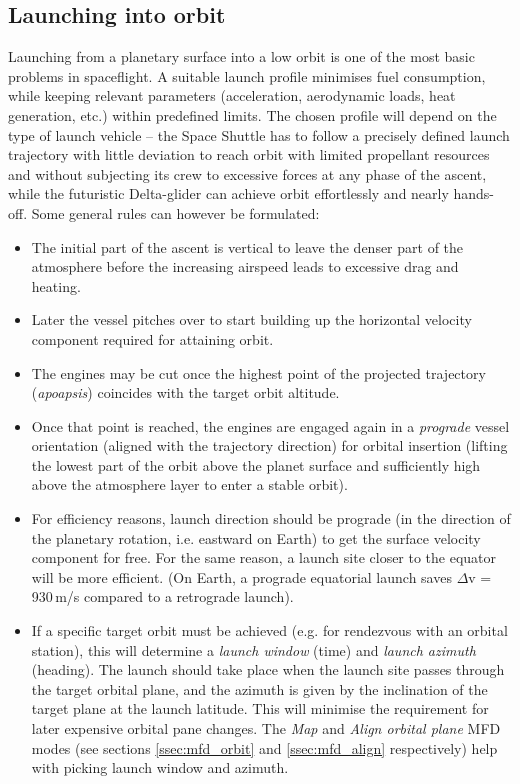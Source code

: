 \documentclass[Orbiter User Manual.tex]{subfiles}
\begin{document}
\subsection{Launching into orbit}
\label{ssec:basic_launch}
Launching from a planetary surface into a low orbit is one of the most basic
problems in spaceflight. A suitable launch profile minimises fuel consumption,
while keeping relevant parameters (acceleration, aerodynamic loads, heat
generation, etc.) within predefined limits. The chosen profile will depend on
the type of launch vehicle -- the Space Shuttle has to follow a precisely
defined launch trajectory with little deviation to reach orbit with limited
propellant resources and without subjecting its crew to excessive forces at any
phase of the ascent, while the futuristic Delta-glider can achieve orbit
effortlessly and nearly hands-off. Some general rules can however be formulated:

\begin{itemize}
	\item The initial part of the ascent is vertical to leave the denser part of
		the atmosphere before the increasing airspeed leads to excessive drag
		and heating.
	\item Later the vessel pitches over to start building up the horizontal
		velocity component required for attaining orbit.
	\item The engines may be cut once the highest point of the projected
		trajectory (\emph{apoapsis}) coincides with the target orbit altitude.
	\item Once that point is reached, the engines are engaged again in a
		\emph{prograde} vessel orientation (aligned with the trajectory
		direction) for orbital insertion (lifting the lowest part of the orbit
		above the planet surface and sufficiently high above the atmosphere
		layer to enter a stable orbit).
	\item For efficiency reasons, launch direction should be prograde (in the
		direction of the planetary rotation, i.e. eastward on Earth) to get the
		surface velocity component for free. For the same reason, a launch site
		closer to the equator will be more efficient. (On Earth, a prograde
		equatorial launch saves $\Delta$v = 930\,m/s compared to a retrograde
		launch).
	\item If a specific target orbit must be achieved (e.g. for rendezvous with
		an orbital station), this will determine a \emph{launch window} (time)
		and \emph{launch azimuth} (heading). The launch should take place when
		the launch site passes through the target orbital plane, and the azimuth
		is given by the inclination of the target plane at the launch latitude.
		This will minimise the requirement for later expensive orbital pane
		changes. The \emph{Map} and \emph{Align orbital plane} MFD modes (see
		sections \ref{ssec:mfd_orbit} and \ref{ssec:mfd_align} respectively)
		help with picking launch window and azimuth.
\end{itemize}
\end{document}

